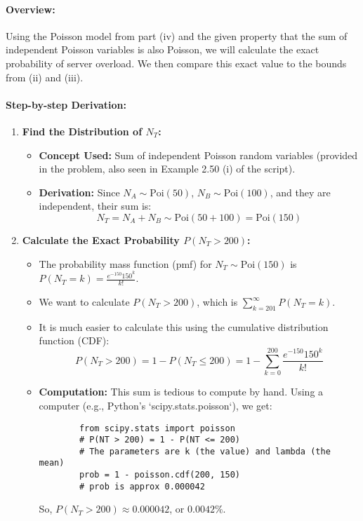 \documentclass[11pt,a4paper]{article}
\begin{document}
\paragraph{Overview:}
Using the Poisson model from part (iv) and the given property that the sum of independent Poisson variables is also Poisson, we will calculate the exact probability of server overload. We then compare this exact value to the bounds from (ii) and (iii).

\paragraph{Step-by-step Derivation:}
\begin{enumerate}
    \item \textbf{Find the Distribution of $N_T$:}
    \begin{itemize}
        \item \textbf{Concept Used:} Sum of independent Poisson random variables (provided in the problem, also seen in Example 2.50 (i) of the script).
        \item \textbf{Derivation:} Since $N_A \sim \text{Poi}(50)$, $N_B \sim \text{Poi}(100)$, and they are independent, their sum is:
        \[
            N_T = N_A + N_B \sim \text{Poi}(50 + 100) = \text{Poi}(150)
        \]
    \end{itemize}

    \item \textbf{Calculate the Exact Probability $P(N_T > 200)$:}
    \begin{itemize}
        \item The probability mass function (pmf) for $N_T \sim \text{Poi}(150)$ is $P(N_T=k) = \frac{e^{-150}150^k}{k!}$.
        \item We want to calculate $P(N_T > 200)$, which is $\sum_{k=201}^{\infty} P(N_T=k)$.
        \item It is much easier to calculate this using the cumulative distribution function (CDF):
        \[
            P(N_T > 200) = 1 - P(N_T \leq 200) = 1 - \sum_{k=0}^{200} \frac{e^{-150}150^k}{k!}
        \]
        \item \textbf{Computation:} This sum is tedious to compute by hand. Using a computer (e.g., Python's `scipy.stats.poisson`), we get:
        \begin{verbatim}
        from scipy.stats import poisson
        # P(NT > 200) = 1 - P(NT <= 200)
        # The parameters are k (the value) and lambda (the mean)
        prob = 1 - poisson.cdf(200, 150)
        # prob is approx 0.000042
        \end{verbatim}
        So, $P(N_T > 200) \approx 0.000042$, or $0.0042\%$.
    \end{itemize}
\end{enumerate}
\end{document}
